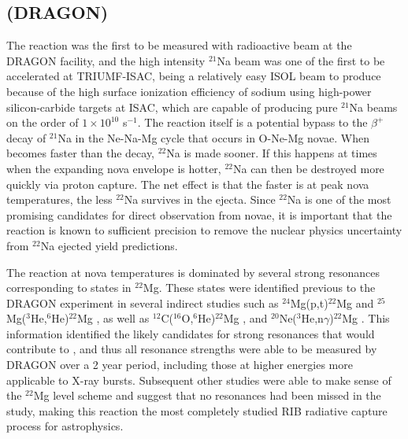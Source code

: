 \subsection{ (DRAGON)}
The  reaction was the first to be measured with radioactive beam at the DRAGON facility, and the high intensity $^{21}$Na beam was one of the first to be accelerated at TRIUMF-ISAC, being a relatively easy ISOL beam to produce because of the high surface ionization efficiency of sodium using high-power silicon-carbide targets at ISAC, which are capable of producing pure $^{21}$Na beams on the order of $1 \times 10^{10}$ s$^{-1}$. 
The  reaction itself is a potential bypass to the $\beta^{+}$ decay of $^{21}$Na in the Ne-Na-Mg cycle that occurs in O-Ne-Mg novae. When  becomes faster than the decay, $^{22}$Na is made sooner. If this happens at times when the expanding nova envelope is hotter, $^{22}$Na can then be destroyed more quickly via proton capture. The net effect is that the faster  is at peak nova temperatures, the less $^{22}$Na survives in the ejecta. Since $^{22}$Na is one of the most promising candidates for direct observation from novae, it is important that the  reaction is known to sufficient precision to remove the nuclear physics uncertainty from $^{22}$Na ejected yield predictions.  

The  reaction at nova temperatures is dominated by several strong resonances corresponding to states in $^{22}$Mg. These states were identified previous to the DRAGON experiment in several indirect studies such as $^{24}$Mg(p,t)$^{22}$Mg \cite{bat01,mic02} and $^{25}$Mg($^{3}$He,$^{6}$He)$^{22}$Mg \cite{cag02}, as well as $^{12}$C($^{16}$O,$^{6}$He)$^{22}$Mg \cite{che01}, and $^{20}$Ne($^{3}$He,n$\gamma$)$^{22}$Mg \cite{rol72}. 
This information identified the likely candidates for strong resonances that would contribute to , and thus all resonance strengths were able to be measured by DRAGON over a 2 year period, including those at higher energies more applicable to X-ray bursts. Subsequent other studies \cite{rui05,sew05} were able to make sense of the $^{22}$Mg level scheme and suggest that no resonances had been missed in the study, making this reaction the most completely studied RIB radiative capture process for astrophysics.  

